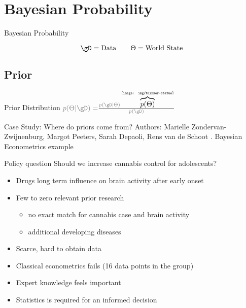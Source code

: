 \documentclass{beamer}
\begin{document}
\section{Bayesian Probability}
\begin{frame}{Bayesian Probability}

    $$\gD = \text{Data}\qquad \Theta = \text{World State}$$
\end{frame}
\subsection{Prior}
\begin{frame}{Prior Distribution}
    \center \Huge $\textcolor{gray}{p(\Theta|\gD)
    =}\frac{
        \textcolor{gray}{p(\gD|\Theta)}\overbrace{p(\Theta)}^{\texttt{[image: img/thinker-statue]}}
        }{
        \textcolor{gray}{p(\gD)}
        }$
\end{frame}
\begin{frame}{Case Study: Where do priors come from?}
Authors: Marielle Zondervan-Zwijnenburg, Margot Peeters, Sarah Depaoli, Rens van de Schoot \cite{where-do-priors-come-from}. Bayesian Econometrics example
\begin{block}{Policy question}
    Should we increase cannabis control for adolescents?
\end{block}
\begin{itemize}
    \item<+-> Drugs long term influence on brain activity after early onset
    \item<+-> Few to zero relevant prior research
    \begin{itemize}
        \item no exact match for cannabis case and brain activity
        \item additional developing diseases 
    \end{itemize}
    \item<+-> Scarce, hard to obtain data
    \item<+-> Classical econometrics fails (16 data points in the
    group)
    \item<+-> Expert knowledge feels important
    \item<+-> Statistics is required for an informed decision
\end{itemize}
\end{frame}
\end{document}
